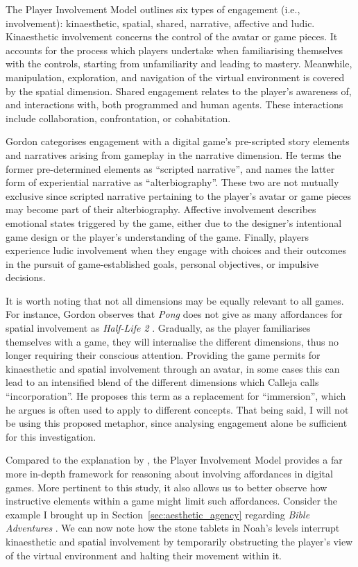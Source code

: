 The Player Involvement Model outlines six types of engagement (i.e., involvement): kinaesthetic, spatial, shared, narrative, affective and ludic. Kinaesthetic involvement concerns the control of the avatar or game pieces. It accounts for the process which players undertake when familiarising themselves with the controls, starting from unfamiliarity and leading to mastery. Meanwhile, manipulation, exploration, and navigation of the virtual environment is covered by the spatial dimension. Shared engagement relates to the player's awareness of, and interactions with, both programmed and human agents. These interactions include collaboration, confrontation, or cohabitation.

Gordon categorises engagement with a digital game's pre-scripted story elements and narratives arising from gameplay in the narrative dimension. He terms the former pre-determined elements as ``scripted narrative'', and names the latter form of experiential narrative as ``alterbiography''. These two are not mutually exclusive since scripted narrative pertaining to the player's avatar or game pieces may become part of their alterbiography. Affective involvement describes emotional states triggered by the game, either due to the designer's intentional game design or the player's understanding of the game. Finally, players experience ludic involvement when they engage with choices and their outcomes in the pursuit of game-established goals, personal objectives, or impulsive decisions.

It is worth noting that not all dimensions may be equally relevant to all games. For instance, Gordon observes that \textit{Pong} \parencite{atari_pong_1972} does not give as many affordances for spatial involvement as \textit{Half-Life 2} \parencite{valve_half_2004}. Gradually, as the player familiarises themselves with a game, they will internalise the different dimensions, thus no longer requiring their conscious attention. Providing the game permits for kinaesthetic and spatial involvement through an avatar, in some cases this can lead to an intensified blend of the different dimensions which Calleja calls ``incorporation''. He proposes this term as a replacement for ``immersion'', which he argues is often used to apply to different concepts. That being said, I will not be using this proposed metaphor, since analysing engagement alone be sufficient for this investigation.

Compared to the explanation by \textcite{king_virtue_2017}, the Player Involvement Model provides a far more in-depth framework for reasoning about involving affordances in digital games. More pertinent to this study, it also allows us to better observe how instructive elements within a game might limit such affordances. Consider the example I brought up in Section~\ref{sec:aesthetic_agency} regarding \textit{Bible Adventures} \parencite{wisdom_tree_bible_1991}. We can now note how the stone tablets in Noah's levels interrupt kinaesthetic and spatial involvement by temporarily obstructing the player's view of the virtual environment and halting their movement within it.

